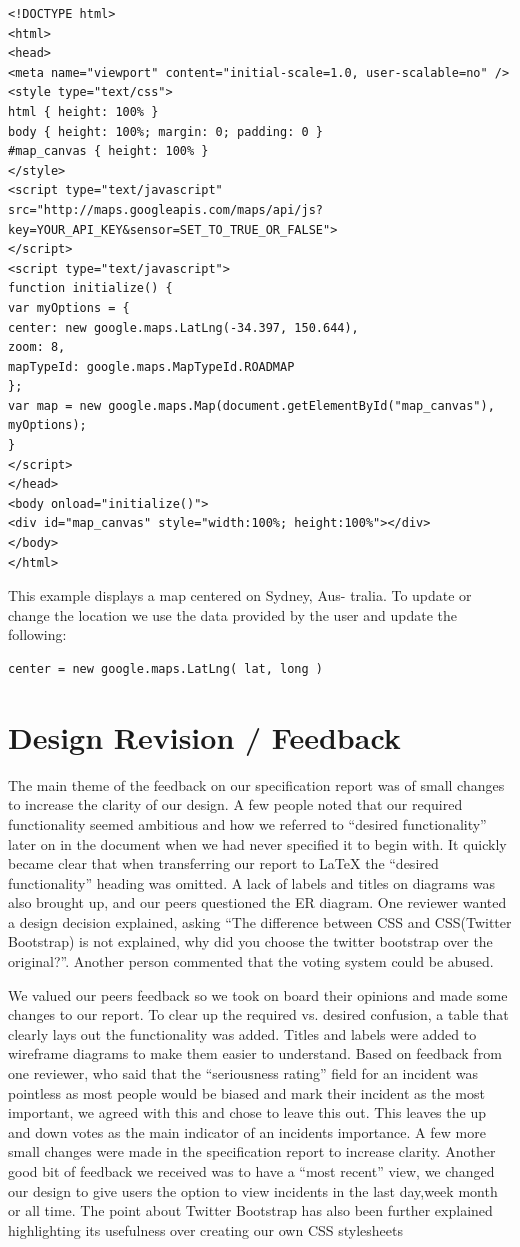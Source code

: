 \documentclass{sig-alt-release2}
\begin{document}
\tiny
\begin{verbatim}
<!DOCTYPE html>
<html>
<head>
<meta name="viewport" content="initial-scale=1.0, user-scalable=no" />
<style type="text/css">
html { height: 100% }
body { height: 100%; margin: 0; padding: 0 }
#map_canvas { height: 100% }
</style>
<script type="text/javascript"
src="http://maps.googleapis.com/maps/api/js?key=YOUR_API_KEY&sensor=SET_TO_TRUE_OR_FALSE">
</script>
<script type="text/javascript">
function initialize() {
var myOptions = {
center: new google.maps.LatLng(-34.397, 150.644),
zoom: 8,
mapTypeId: google.maps.MapTypeId.ROADMAP
};
var map = new google.maps.Map(document.getElementById("map_canvas"),
myOptions);
}
</script>
</head>
<body onload="initialize()">
<div id="map_canvas" style="width:100%; height:100%"></div>
</body>
</html>
\end{verbatim}
\normalsize

This example displays a map centered on Sydney, Aus-
tralia. To update or change the location we use the data
provided by the user and update the following:

\begin{verbatim}
center = new google.maps.LatLng( lat, long )
\end{verbatim}

\section{Design Revision / Feedback}
The main theme of the feedback on our specification report was of small changes to increase the clarity of our design. A few people noted that our required functionality seemed ambitious and how we referred to ``desired functionality'' later on in the document when we had never specified it to begin with. It quickly became clear that when transferring our report to LaTeX the ``desired functionality'' heading was omitted. A lack of labels and titles on diagrams was also brought up, and our peers questioned the ER diagram.  One reviewer wanted a design decision explained, asking ``The difference between CSS and CSS(Twitter Bootstrap) is not explained, why did you choose the twitter bootstrap over the original?''. Another person commented that the voting system could be abused.

We valued our peers feedback so we took on board their opinions and made some changes to our report. To clear up the required vs. desired confusion, a table that clearly lays out the functionality was added. Titles and labels were added to wireframe diagrams to make them easier to understand. Based on feedback from one reviewer, who said that the ``seriousness rating'' field for an incident was pointless as most people would be biased and mark their incident as the most important, we agreed with this and chose to leave this out. This leaves the up and down votes as the main indicator of an incidents importance. A few more small changes were made in the specification report to increase clarity. Another good bit of feedback we received was to have a ``most recent'' view, we changed our design to give users the option to view incidents in the last day,week month or all time. The point about Twitter Bootstrap has also been further explained highlighting its usefulness over creating our own CSS stylesheets
\end{document}
